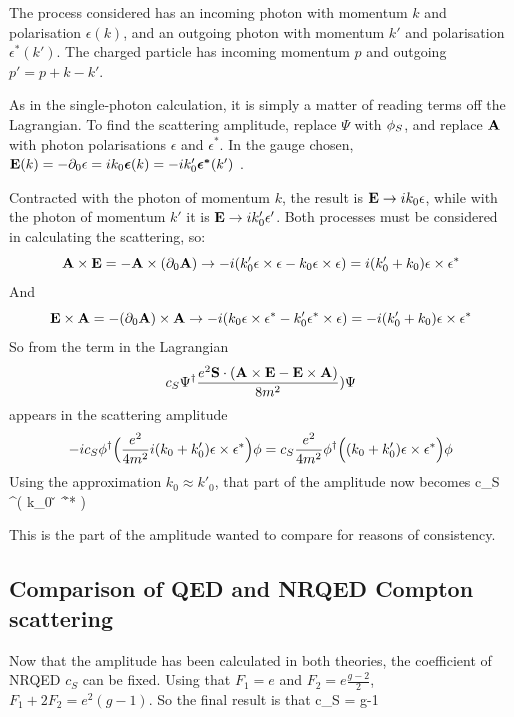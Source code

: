 The process considered has an incoming photon with momentum $k$ and polarisation $\epsilon(k)$, and an outgoing photon with momentum $k'$ and polarisation $\epsilon^*(k')$.  The charged particle has incoming momentum $p$ and outgoing $p'= p + k - k'$.

As in the single-photon calculation, it is simply a matter of reading terms off the Lagrangian.  To find the scattering amplitude,  replace $\Psi$ with $\phi_S$, and replace $\mathbf{A}$ with photon polarisations $\epsilon$ and $\epsilon^*$.  In the gauge chosen, $\mathbf{E}(k) = -\partial_0 \mathbf{\epsilon} = i k_0 \mbox{\boldmath$ \epsilon $}(k) = -ik'_0 \mbox{\boldmath$ \epsilon^* $}(k') $ .

Contracted with the photon of momentum $k$, the result is $\mathbf{E} \to i k_0 \mathbf{\epsilon}$, while with the photon of momentum $k'$ it is $\mathbf{E} \to i k'_0 \mathbf{\epsilon'}$.  Both processes must be considered in calculating the scattering, so:
\[
	\mathbf{A} \times \mathbf{E} = - \mathbf{A} \times (\partial_0 \mathbf{A})
		\to 
	-i(k_0' \mathbf{\epsilon} \times \mathbf{\epsilon} - k_0 \mathbf{\epsilon} \times \mathbf{\epsilon} ) = i ( k_0' + k_0) \mathbf{\epsilon} \times \mathbf{\epsilon}^*
\]
And
\[
	\mathbf{E} \times \mathbf{A} = - (\partial_0 \mathbf{A}) \times  \mathbf{A}
		\to 
	-i( k_0 \mathbf{\epsilon} \times \mathbf{\epsilon^*} - k_0' \mathbf{\epsilon^*} \times \mathbf{\epsilon} ) = -i ( k_0' + k_0) \mathbf{\epsilon} \times \mathbf{\epsilon^*}
\]
So from the term in the Lagrangian 
\[
 c_S \Psi^\dagger \frac{ e^2 \mathbf{S} \cdot ( \mathbf{A} \times \mathbf{E} - \mathbf{E} \times \mathbf{A} )}{8m^2} ) \Psi
\]
appears in the scattering amplitude
\[
  -i c_S \phi^\dagger  \Big ( \frac{e^2}{4m^2}    i(k_0 + k_0')    \mathbf{\epsilon} \times \mathbf{\epsilon^*} \Big ) \phi
	=
     c_S \frac{e^2}{4m^2} \phi^\dagger  \Big ( (k_0 + k_0')    \mathbf{\epsilon} \times \mathbf{\epsilon^*} \Big ) \phi
\]
Using the approximation $k_0 \approx k'_0$, that part of the amplitude now becomes
\beq \label{eq:Sh:ComptNR}
     c_S  \phi^\dagger  \Big ( k_0    \v{\epsilon} \times \v{\epsilon^*} \Big ) \phi
\eeq


This is the part of the amplitude wanted to compare for reasons of consistency.
	

\subsection{Comparison of QED and NRQED Compton scattering}
Now that the amplitude has been calculated in both theories, the coefficient of NRQED $c_S$ can be fixed.  Using that $F_1 = e$ and $F_2 = e\frac{g-2}{2}$, $F_1 + 2F_2 = e^2(g-1)$.
So the final result is that 
\beq
	c_S = g-1
\eeq
 



